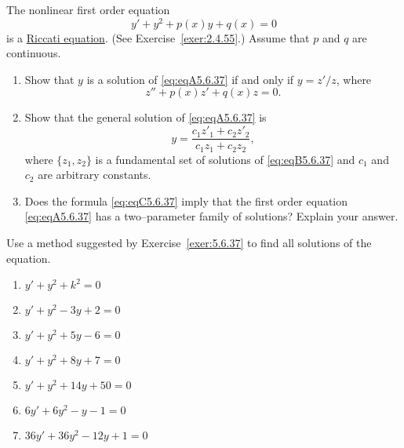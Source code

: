 \documentclass{ximera}
\begin{document}
\begin{problem}\label{exer:5.6.37}
The nonlinear first order equation
\begin{equation}\label{eq:eqA5.6.37}
y'+y^2+p(x)y+q(x)=0
\end{equation}
is a
\href{http://http://www-history.mcs.st-and.ac.uk/Indexes/Riccati.html}
{Riccati equation}.  (See
Exercise~\ref{exer:2.4.55}.) Assume that $p$ and $q$ are continuous.
\begin{enumerate}
\item %
Show that $y$ is a solution of \ref{eq:eqA5.6.37} if and only if $y={z'/z}$, where
\begin{equation}\label{eq:eqB5.6.37}
z''+p(x)z'+q(x)z=0.
\end{equation}

\item %
 Show that the general solution of \ref{eq:eqA5.6.37} is
\begin{equation}\label{eq:eqC5.6.37}
y=\frac{c_1z'_1+c_2z'_2}{c_1z_1+c_2z_2},
\end{equation}
where $\{z_1,z_2\}$ is a fundamental
set of solutions of \ref{eq:eqB5.6.37} and $c_1$ and $c_2$ are
arbitrary constants.

\item %
Does the formula \ref{eq:eqC5.6.37} imply that the first order equation
\ref{eq:eqA5.6.37} has a two--parameter family of solutions?
Explain your answer.
\end{enumerate}
\end{problem}

\begin{problem}\label{exer:5.6.38}
Use a method suggested by Exercise~\ref{exer:5.6.37}  to find all
solutions of the equation.

\begin{enumerate}

\item $y'+y^2+k^2=0$

\item$y'+y^2-3y+2=0$

\item $y'+y^2+5y-6=0$

\item $y'+y^2+8y+7=0$

\item $y'+y^2+14y+50=0$

\item $6y'+6y^2-y-1=0$


\item $36y'+36y^2-12y+1=0$
\end{enumerate}
\end{problem}
\end{document}
